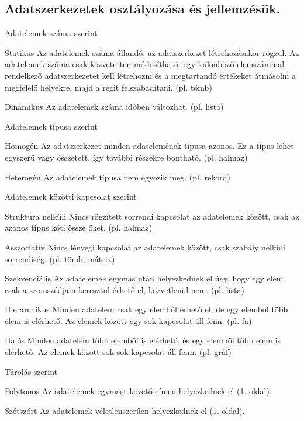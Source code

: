 \subsection{Adatszerkezetek osztályozása és jellemzésük. }
\begin{enumdescript}[]
	\item [Adatelemek száma szerint] ~
	\begin{enumdescript}[nosep]
		\item[Statikus] Az adatelemek száma állandó, az adatszerkezet létrehozásakor rögzül. Az adatelemek száma csak közvetetten módosítható: egy különböző elemszámmal rendelkező adatszerkezetet kell létrehozni és a megtartandó értékeket átmásolni a megfelelő helyekre, majd a régit felszabadítani. (pl. tömb)
		\item[Dinamikus] Az adatelemek száma időben változhat. (pl. lista)
	\end{enumdescript}
	\item [Adatelemek típusa szerint] ~
	\begin{enumdescript}[nosep]
		\item [Homogén] Az adatszerkezet minden adatelemének típusa azonos. Ez a típus lehet egyszerű vagy összetett, így további részekre bontható. (pl. halmaz)
		\item [Heterogén] Az adatelemek típusa nem egyezik meg. (pl. rekord)
	\end{enumdescript}
	\item [Adatelemek közötti kapcsolat szerint] ~
	\begin{enumdescript}[nosep]
		\item [Struktúra nélküli] Nincs rögzített sorrendi kapcsolat az adatelemek között, csak az azonos típus köti össze őket. (pl. halmaz)
		\item [Asszociatív] Nincs lényegi kapcsolat az adatelemek között, csak szabály nélküli sorrendiség. (pl. tömb, mátrix)
		\item [Szekvenciális] Az adatelemek egymás után helyezkednek el úgy, hogy egy elem csak a szomszédjain keresztül érhető el, közvetlenül nem. (pl. lista)
		\item [Hierarchikus] Minden adatelem csak egy elemből érhető el, de egy elemből több elem is elérhető. Az elemek között egy-sok kapcsolat áll fenn. (pl. fa)
		\item [Hálós] Minden adatelem több elemből is elérhető, és egy elemből több elem is elérhető. Az elemek között sok-sok kapcsolat áll fenn. (pl. gráf)
	\end{enumdescript}
	\item [Tárolás szerint] ~
	\begin{enumdescript}[nosep]
		\item [Folytonos] Az adatelemek egymást követő címen helyezkednek el (1. oldal).
		\item [Szétszórt] Az adatelemek véletlenszerűen helyezkednek el (1. oldal).
	\end{enumdescript}
\end{enumdescript}

